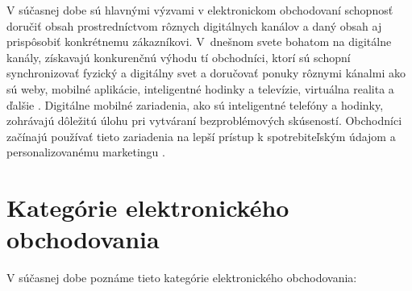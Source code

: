 \documentclass[
  printed, %
  table,   %
  lof,     %
  nolot,     %
  twoside,  
]{fithesis3}
\begin{document}
V súčasnej dobe sú hlavnými výzvami v elektronickom obchodovaní schopnosť doručiť obsah prostredníctvom rôznych digitálnych kanálov a daný obsah aj prispôsobiť konkrétnemu zákazníkovi. V~dnešnom svete bohatom na digitálne kanály, získavajú konkurenčnú výhodu tí obchodníci, ktorí sú schopní synchronizovať fyzický a digitálny svet a doručovať ponuky rôznymi kánalmi ako sú weby, mobilné aplikácie, inteligentné hodinky a televízie, virtuálna realita a ďalšie \cite{trends1}. Digitálne mobilné zariadenia, ako sú inteligentné telefóny a hodinky, zohrávajú dôležitú úlohu pri vytváraní bezproblémových skúseností. Obchodníci začínajú používať tieto zariadenia na lepší prístup k spotrebiteľským údajom a personalizovanému marketingu \cite{trends2}.
\newpage
\section{Kategórie elektronického obchodovania}
V súčasnej dobe poznáme tieto kategórie elektronického obchodovania:
\end{document}
